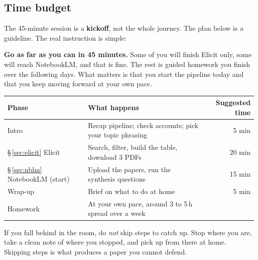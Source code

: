 \documentclass[11pt,a4paper]{article}
\begin{document}
\begin{center}
{%
}%
\end{center}
\vspace{0.4em}

\subsection{Time budget}

The 45-minute session is a \textbf{kickoff}, not the whole journey. The plan below is a guideline. The real instruction is simple:

\begin{tipbox}
\textbf{Go as far as you can in 45 minutes.} Some of you will finish Elicit only, some will reach NotebookLM, and that is fine. The rest is guided homework you finish over the following days. What matters is that you start the pipeline today and that you keep moving forward at your own pace.
\end{tipbox}

\begin{center}
\small
\begin{tabularx}{\linewidth}{@{}l X r@{}}
\toprule
\textbf{Phase} & \textbf{What happens} & \textbf{Suggested time} \\
\midrule
Intro & Recap pipeline; check accounts; pick your topic phrasing & 5 min \\
\S\,\ref{sec:elicit} Elicit & Search, filter, build the table, download 3 PDFs & 20 min \\
\S\,\ref{sec:nblm} NotebookLM (start) & Upload the papers, run the synthesis questions & 15 min \\
Wrap-up & Brief on what to do at home & 5 min \\
\midrule
Homework & At your own pace, around 3 to 5\,h spread over a week & \\
\bottomrule
\end{tabularx}
\end{center}

\noindent If you fall behind in the room, do \emph{not} skip steps to catch up. Stop where you are, take a clean note of where you stopped, and pick up from there at home. Skipping steps is what produces a paper you cannot defend.
\end{document}
